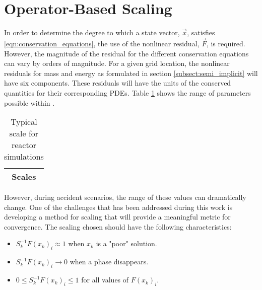 \section{Operator-Based Scaling}
\label{sect:operator_scaling}
In order to determine the degree to which a state vector, $\vec{x}$, satisfies \eqref{eqn:conservation_equations}, the use of the nonlinear residual, $\vec{F}$, is required.
However, the magnitude of the residual for the different conservation equations can vary by orders of magnitude. 
For a given grid location, the nonlinear residuals for mass and energy as formulated in section \ref{subsect:semi_implicit} will have six components.
These residuals will have the units of the conserved quantities for their corresponding PDEs.
Table \ref{tab:scaling_units_scales} shows the range of parameters possible within \cobra{}.

\begin{table}[ht]
\centering
\begin{tabular}{@{}c@{}} \toprule
Scales \\
\bottomrule  
\end{tabular}
\caption{Typical scale for reactor simulations}
\label{tab:scaling_units_scales}
\end{table}

However, during accident scenarios, the range of these values can dramatically change.
One of the challenges that has been addressed during this work is developing a method for scaling that will provide a meaningful metric for convergence.
The scaling chosen should have the following characteristics:
\begin{itemize}
\item{$S^{-1}_k F(x_k)_i \approx 1$ when $x_k$ is a "poor" solution.}
\item{$S^{-1}_k F(x_k)_i \rightarrow 0$ when a phase disappears.}
\item{$0 \leq S^{-1}_k F(x_k)_i \leq 1 $ for all values of $F(x_k)_i$.}
\end{itemize}

